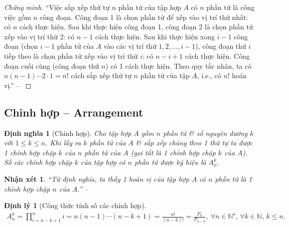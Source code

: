 \documentclass[oneside]{book}
\numberwithin{equation}{section}
\newtheorem{nhanxet}{Nhận xét}[section]
\newtheorem{dinhnghia}{Định nghĩa}[section]
\newtheorem{dinhly}{Định lý}[section]
\begin{document}
\begin{proof}[Chứng minh]
	``Việc sắp xếp thứ tự $n$ phần tử của tập hợp $A$ có $n$ phần tử là công việc gồm $n$ công đoạn. Công đoạn 1 là chọn phần tử để xếp vào vị trí thứ nhất: có $n$ cách thực hiện. Sau khi thực hiện công đoạn 1, công đoạn 2 là chọn phần tử xếp vào vị trí thứ 2: có $n - 1$ cách thực hiện. Sau khi thực hiện xong $i - 1$ công đoạn (chọn $i - 1$ phần tử của $A$ vào các vị trí thứ $1,2,\ldots,i - 1$), công đoạn thứ $i$ tiếp theo là chọn phần tử xếp vào vị trí thứ $i$: có $n - i + 1$ cách thực hiện. Công đoạn cuối cùng (công đoạn thứ $n$) có 1 cách thực hiện. Theo quy tắc nhân, ta có $n(n - 1)\cdots 2\cdot 1 = n!$ cách sắp xếp thứ tự $n$ phần tử của tập $A$, i.e., có $n!$ hoán vị.'' -- \cite[p. 85]{TL_chuyen_Toan_Dai_So_Giai_Tich_11}
\end{proof}

\subsection{Chỉnh hợp -- Arrangement}

\begin{dinhnghia}[Chỉnh hợp]
	Cho tập hợp $A$ gồm $n$ phần tử \& số nguyên dương $k$ với $1\le k\le n$. Khi lấy ra $k$ phần tử của $A$ \& sắp xếp chúng theo 1 thứ tự ta được 1 \emph{chỉnh hợp chập $k$ của $n$ phần tử của $A$} (gọi tắt là 1 \emph{chỉnh hợp chập $k$ của $A$}). Số các chỉnh hợp chập $k$ của tập hợp có $n$ phần tử được ký hiệu là $A_n^k$.
\end{dinhnghia}

\begin{nhanxet}
	``Từ định nghĩa, ta thấy 1 hoán vị của tập hợp $A$ có $n$ phần tử là 1 chỉnh hợp chập $n$ của $A$.'' -- \cite[p. 85]{TL_chuyen_Toan_Dai_So_Giai_Tich_11}
\end{nhanxet}

\begin{dinhly}[Công thức tính số các chỉnh hợp]
	\label{thm:chinh hop}
	\begin{align}
		\label{chinh hop}
		A_n^k = \prod_{i = n - k + 1}^n i = n(n - 1)\cdots(n - k + 1) = \frac{n!}{(n - k)!} = \frac{P_n}{P_{n-k}},\ \forall n\in\mathbb{N}^\star,\,\forall k\in\mathbb{N},\,k\le n.
	\end{align}
\end{dinhly}
\end{document}
